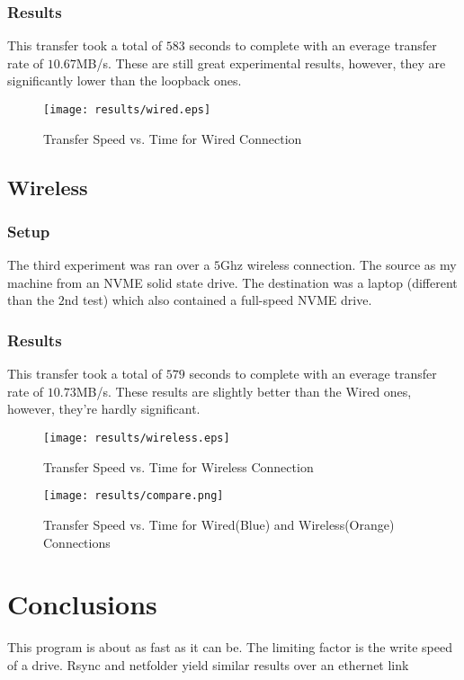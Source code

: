 \documentclass{article}
\begin{document}
\subsubsection{Results}
This transfer took a total of $583$ seconds to complete with an everage transfer rate of $10.67$MB/s. These are still great experimental results, however, they are significantly lower than the loopback ones. 

\begin{figure}
	\centering
	\texttt{[image: results/wired.eps]}
	\caption{Transfer Speed vs. Time for Wired Connection}
\end{figure}

\subsection{Wireless}
\subsubsection{Setup}
The third experiment was ran over a $5$Ghz wireless connection. The source as my machine from an NVME solid state drive. The destination was a laptop (different than the $2$nd test) which also contained a full-speed NVME drive.
\subsubsection{Results}
This transfer took a total of $579$ seconds to complete with an everage transfer rate of $10.73$MB/s. These results are slightly better than the Wired ones, however, they're hardly significant. 

\begin{figure}
	\centering
	\texttt{[image: results/wireless.eps]}
	\caption{Transfer Speed vs. Time for Wireless Connection}
\end{figure}
\begin{figure}
	\centering
	\texttt{[image: results/compare.png]}
	\caption{Transfer Speed vs. Time for Wired(Blue) and Wireless(Orange) Connections}
\end{figure}

\section{Conclusions}
This program is about as fast as it can be. The limiting factor is the write speed of a drive. Rsync and netfolder yield similar results over an ethernet link
\end{document}
